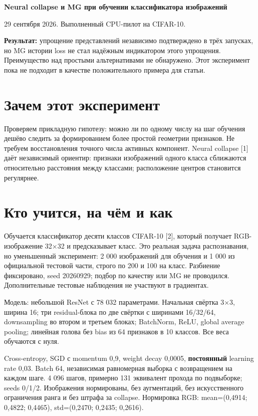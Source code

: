 \documentclass[10pt,a4paper]{article}
\begin{document}
{\Large\bfseries Neural collapse и MG при обучении классификатора изображений}\par\medskip

29 сентября 2026. Выполненный CPU-пилот на CIFAR-10.

\textbf{Результат:} упрощение представлений независимо подтверждено в трёх запусках, но MG истории loss не стал надёжным индикатором этого упрощения. Преимущество над простыми альтернативами не обнаружено. Этот эксперимент пока не подходит в качестве положительного примера для статьи.

\section*{Зачем этот эксперимент}

Проверяем прикладную гипотезу: можно ли по одному числу на шаг обучения дешёво следить за формированием более простой геометрии признаков. Не требуем восстановления точного числа активных компонент. Neural collapse [1] даёт независимый ориентир: признаки изображений одного класса сближаются относительно расстояния между классами; расположение центров становится регулярнее.

\section*{Кто учится, на чём и как}

Обучается классификатор десяти классов CIFAR-10 [2], который получает RGB-изображение 32\ensuremath{\times}32 и предсказывает класс. Это реальная задача распознавания, но уменьшенный эксперимент: 2 000 изображений для обучения и 1 000 из официальной тестовой части, строго по 200 и 100 на класс. Разбиение фиксировано, seed 20260929; подбор по качеству или MG не проводился. Дополнительные тестовые наблюдения не участвуют в градиентах.

Модель: небольшой ResNet с 78 032 параметрами. Начальная свёртка 3\ensuremath{\times}3, ширина 16; три residual-блока по две свёртки с ширинами 16/32/64, downsampling во втором и третьем блоках; BatchNorm, ReLU, global average pooling; линейная голова без bias из 64 признаков в 10 классов. Все веса обучаются с нуля.

Cross-entropy, SGD с momentum 0,9, weight decay 0,0005, \textbf{постоянный} learning rate 0,03. Batch 64, независимая равномерная выборка с возвращением на каждом шаге. 4 096 шагов, примерно 131 эквивалент прохода по подвыборке; seeds 0/1/2. Изображения нормированы, без аугментаций, без искусственного ограничения ранга и без штрафа за collapse. Нормировка RGB: mean=(0,4914; 0,4822; 0,4465), std=(0,2470; 0,2435; 0,2616).
\end{document}
